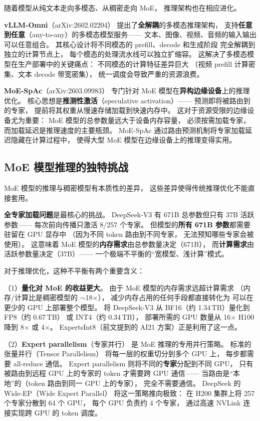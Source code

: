 随着模型从纯文本走向多模态、从稠密走向 MoE，
推理架构也在相应进化。

\textbf{vLLM-Omni}（arXiv:2602.02204）
提出了\textbf{全解耦}的多模态推理架构，
支持\textbf{任意到任意}（any-to-any）的多模态模型服务——
文本、图像、视频、音频的输入输出可以任意组合。
其核心设计将不同模态的 prefill、decode 和生成阶段
完全解耦到独立的计算节点上，
每个模态的处理流水线可以独立扩缩容。
这解决了多模态模型在生产部署中的关键痛点：
不同模态的计算特征差异巨大
（视频 prefill 计算密集、文本 decode 带宽密集），
统一调度会导致严重的资源浪费。

\textbf{MoE-SpAc}（arXiv:2603.09983）
专门针对 MoE 模型在\textbf{异构边缘设备}上的推理优化。
核心思想是\textbf{推测性激活}（speculative activation）——
预测即将被路由到的专家，
提前将其权重从慢速存储加载到快速内存中。
这对于资源受限的边缘设备尤为重要：
MoE 模型的总参数量远大于设备内存容量，
必须按需加载专家，
而加载延迟是推理速度的主要瓶颈。
MoE-SpAc 通过路由预测机制将专家加载延迟隐藏在计算过程中，
使得大型 MoE 模型在边缘设备上的推理变得实用。

\subsection{MoE 模型推理的独特挑战}

MoE 模型的推理与稠密模型有本质性的差异，
这些差异使得传统推理优化不能直接套用。

\textbf{全专家加载问题}是最核心的挑战。
DeepSeek-V3 有 671B 总参数但只有 37B 活跃参数——
每次前向传播只激活 8/257 个专家。
但模型的\textbf{所有 671B 参数}都需要驻留在 GPU 显存中
（因为不同 token 路由到不同专家，
无法预知哪些专家会被使用）。
这意味着 MoE 模型的\textbf{内存需求}由总参数量决定（671B），
而\textbf{计算需求}由活跃参数量决定（37B）——
一个极端不平衡的``宽模型、浅计算''模式。

对于推理优化，这种不平衡有两个重要含义：

（1）\textbf{量化对 MoE 的收益更大}。
由于 MoE 模型的内存需求远超计算需求
（内存/计算比是稠密模型的 $\sim$18$\times$），
减少内存占用的任何手段都直接转化为
可以在更少的 GPU 上部署整个模型。
将 DeepSeek-V3 从 BF16（约 1.34\,TB）量化到 FP8（约 0.67\,TB）
或 INT4（约 0.34\,TB），
部署所需的 GPU 数量从 16$\times$ H100 降到 8$\times$ 或 4$\times$。
ExpertsInt8（前文提到的 AI21 方案）正是利用了这一点。

（2）\textbf{Expert parallelism}（专家并行）
是 MoE 推理的专用并行策略。
标准的张量并行（Tensor Parallelism）
将每一层的权重切分到多个 GPU 上，
每步都需要 all-reduce 通信。
Expert parallelism 则将不同的\textbf{专家}分配到不同 GPU，
只有被路由到远程 GPU 上的专家的 token
才需要跨 GPU 通信——
当路由是``本地''的（token 路由到同一 GPU 上的专家），
完全不需要通信。
DeepSeek 的 Wide-EP（Wide Expert Parallel）
将这一策略推向极致：
在 H200 集群上将 257 个专家分散到 64 个 GPU，
每个 GPU 负责约 4 个专家，
通过高速 NVLink 连接实现跨 GPU 的 token 调度。

